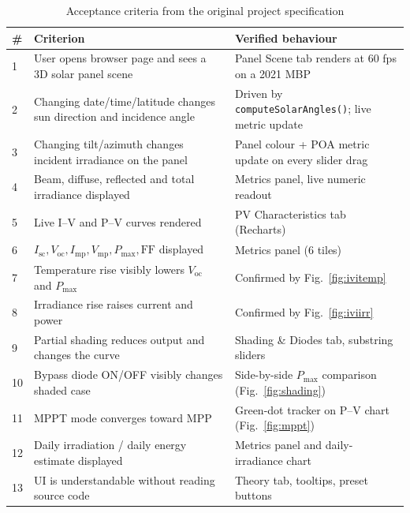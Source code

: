 \documentclass[conference]{IEEEtran}
\begin{document}
\begin{table}[t]
\caption{Acceptance criteria from the original project specification}
\label{tab:accept}
\centering
\begin{tabular}{@{}lll@{}}
\toprule
\# & Criterion & Verified behaviour \\
\midrule
1 & User opens browser page and sees a 3D solar panel scene                               & Panel Scene tab renders at 60 fps on a 2021 MBP \\
2 & Changing date/time/latitude changes sun direction and incidence angle                  & Driven by \texttt{computeSolarAngles()}; live metric update \\
3 & Changing tilt/azimuth changes incident irradiance on the panel                         & Panel colour + POA metric update on every slider drag \\
4 & Beam, diffuse, reflected and total irradiance displayed                                & Metrics panel, live numeric readout \\
5 & Live I--V and P--V curves rendered                                                     & PV Characteristics tab (Recharts) \\
6 & $I_\text{sc},V_\text{oc},I_\text{mp},V_\text{mp},P_\text{max},\mathrm{FF}$ displayed  & Metrics panel (6 tiles) \\
7 & Temperature rise visibly lowers $V_\text{oc}$ and $P_\text{max}$                       & Confirmed by Fig.~\ref{fig:ivitemp} \\
8 & Irradiance rise raises current and power                                               & Confirmed by Fig.~\ref{fig:iviirr} \\
9 & Partial shading reduces output and changes the curve                                   & Shading \& Diodes tab, substring sliders \\
10 & Bypass diode ON/OFF visibly changes shaded case                                       & Side-by-side $P_\text{max}$ comparison (Fig.~\ref{fig:shading}) \\
11 & MPPT mode converges toward MPP                                                         & Green-dot tracker on P--V chart (Fig.~\ref{fig:mppt}) \\
12 & Daily irradiation / daily energy estimate displayed                                    & Metrics panel and daily-irradiance chart \\
13 & UI is understandable without reading source code                                       & Theory tab, tooltips, preset buttons \\
\bottomrule
\end{tabular}
\end{table}
\end{document}
